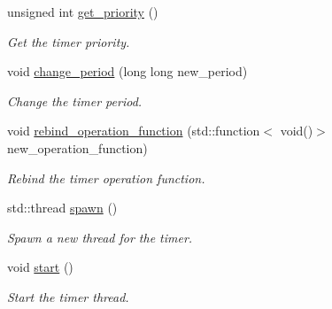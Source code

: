 \begin{DoxyCompactItemize}
unsigned int \hyperlink{classzcm_1_1Timer_a468548503d67c3e3872cf85d86cb26ba}{get\-\_\-priority} ()
\begin{DoxyCompactList}\small\item\em Get the timer priority. \end{DoxyCompactList}\item 
void \hyperlink{classzcm_1_1Timer_a70d8498a7fcfacc90a4510baa55682ef}{change\-\_\-period} (long long new\-\_\-period)
\begin{DoxyCompactList}\small\item\em Change the timer period. \end{DoxyCompactList}\item 
void \hyperlink{classzcm_1_1Timer_ace30a8e8155fcacf5ea8b7eee796b02b}{rebind\-\_\-operation\-\_\-function} (std\-::function$<$ void()$>$ new\-\_\-operation\-\_\-function)
\begin{DoxyCompactList}\small\item\em Rebind the timer operation function. \end{DoxyCompactList}\item 
std\-::thread \hyperlink{classzcm_1_1Timer_a05e22ac74661a4891f610e0c0d364ca7}{spawn} ()
\begin{DoxyCompactList}\small\item\em Spawn a new thread for the timer. \end{DoxyCompactList}\item 
void \hyperlink{classzcm_1_1Timer_a2a7ba9c6294a1a726844c71db962a280}{start} ()
\begin{DoxyCompactList}\small\item\em Start the timer thread. \end{DoxyCompactList}\end{DoxyCompactItemize}
